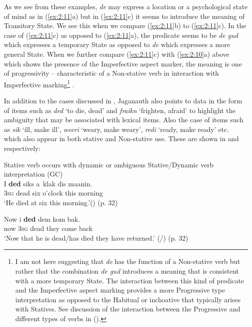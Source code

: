 As we see from these examples, \textit{de} may express a location or a
psychological state of mind as in (\ref{ex:2:11}a) but in
(\ref{ex:2:11}c) it seems to introduce the meaning of Transitory
State.  We see this when we compare (\ref{ex:2:11}b) to
(\ref{ex:2:11}c).  In the case of (\ref{ex:2:11}c) as opposed to
(\ref{ex:2:11}a), the predicate seems to be \textit{de gud} which
expresses a temporary State as opposed to \textit{de} which expresses
a more general State. When we further compare (\ref{ex:2:11}c) with
(\ref{ex:2:10}a) above which shows the presence of the Imperfective
aspect marker, the meaning is one of progressivity -- characteristic of
a Non-stative verb in interaction with Imperfective marking\footnote{I
  am not here suggesting that \textit{de} has the function of a
  Non-stative verb but rather that the combination \textit{de gud}
  introduces a meaning that is consistent with a more temporary
  State. The interaction between this kind of predicate and the
  Imperfective aspect marking provides a more Progressive type
  interpretation as opposed to the Habitual or inchoative that
  typically arises with Statives. See discussion of the interaction
  between the Progressive and different types of verbs in 
  ().} .

In addition to the cases discussed in , Jaganauth also
points to data in the form of items such as \textit{ded} `to die,
dead' and \textit{fraikn} `frighten, afraid' to highlight the
ambiguity that may be associated with lexical items. Also the case of
items such as \textit{sik} `ill, make ill', \textit{weeri} `weary,
make weary', \textit{redi} `ready, make ready' etc. which also appear
in both stative and Non-stative use. These are shown in 
and  respectively:

\ea%
\label{ex:2:12}

{Stative verb occurs with dynamic or ambiguous Stative\slash Dynamic verb interpretation (GC)} \citep{Jaganauth1987}\\

\ea
\gll  I \textbf{ded} siks a~klak     dis maanin.\\
        \textsc{3sg} dead    six o’clock   this morning\\
\glt `He died at six this morning.'(\DYNAMIC) (p. 32)

\ex
\gll Now   i \textbf{ded} dem    kom    bak.\\
now \textsc{3sg} dead    they come back \\
\glt `Now that he is dead/has died they have returned.'
(\STATIVE/\DYNAMIC) (p.  32)

